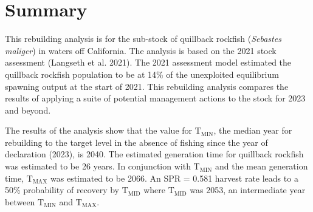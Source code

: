 \documentclass[11pt,
  english,
  letterpaper,
]{article}
\begin{document}
\newcommand{\lt}{\ensuremath <}
\newcommand{\gt}{\ensuremath >}

\pagebreak
{}
\setcounter{page}{1}

\renewcommand{\thetable}{\roman{table}}
\renewcommand{\thefigure}{\roman{figure}}

\setlength\parskip{0.5em plus 0.1em minus 0.2em}


\hypertarget{summary}{%
\section*{Summary}\label{summary}}

\leavevmode\tagmcend\tagstructend


This rebuilding analysis is for the sub-stock of quillback rockfish (\emph{Sebastes maliger}) in waters off California. The analysis is based on the 2021 stock assessment {(Langseth et al. 2021)\leavevmode\tagmcend\tagstructend}. The 2021 assessment model estimated the quillback rockfish population to be at 14\% of the unexploited equilibrium spawning output at the start of 2021. This rebuilding analysis compares the results of applying a suite of potential management actions to the stock for 2023 and beyond.

\leavevmode\tagmcend\tagstructend\par


The results of the analysis show that the value for {\(\text{T}_\text{MIN}\)\leavevmode\tagmcend\tagstructend}, the median year for rebuilding to the target level in the absence of fishing since the year of declaration (2023), is 2040. The estimated generation time for quillback rockfish was estimated to be 26 years. In conjunction with {\(\text{T}_\text{MIN}\)\leavevmode\tagmcend\tagstructend} and the mean generation time, {\(\text{T}_\text{MAX}\)\leavevmode\tagmcend\tagstructend} was estimated to be 2066. An SPR = 0.581 harvest rate leads to a 50\% probability of recovery by {\(\text{T}_\text{MID}\)\leavevmode\tagmcend\tagstructend} where {\(\text{T}_\text{MID}\)\leavevmode\tagmcend\tagstructend} was 2053, an intermediate year between {\(\text{T}_\text{MIN}\)\leavevmode\tagmcend\tagstructend} and {\(\text{T}_\text{MAX}\)\leavevmode\tagmcend\tagstructend}.
\end{document}
